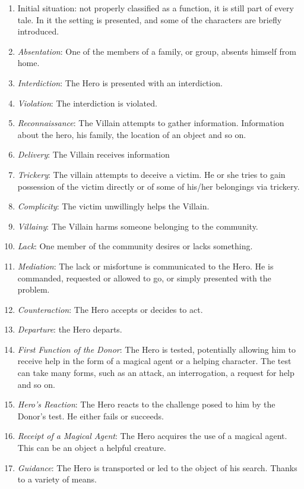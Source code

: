 \documentclass[12pt,a4paper,oneside]{report}
\begin{document}
\begin{enumerate}\setlength{\itemsep}{0pt}
\setcounter{enumi}{-1}
\item Initial situation: not properly classified as a function, it is still part of every tale. In it the setting is presented, and some of the characters are briefly introduced.
\item \textit{Absentation}: One of the members of a family, or group, absents himself from home.
\item \textit{Interdiction}: The Hero is presented with an interdiction.
\item \textit{Violation}: The interdiction is violated.
\item \textit{Reconnaissance}: The Villain attempts to gather information. Information about the hero, his family, the location of an object and so on.
\item \textit{Delivery}: The Villain receives information
\item \textit{Trickery}: The villain attempts to deceive a victim. He or she tries to gain possession of the victim directly or of some of his/her belongings via trickery.
\item \textit{Complicity}: The victim unwillingly helps the Villain.
\item \textit{Villainy}: The Villain harms someone belonging to the community.
\item \textit{Lack}: One member of the community desires or lacks something.
\item \textit{Mediation}: The lack or misfortune is communicated to the Hero. He is commanded, requested or allowed to go, or simply presented with the problem.
\item \textit{Counteraction}: The Hero accepts or decides to act.
\item \textit{Departure}:  the Hero departs.
\item \textit{First Function of the Donor}: The Hero is tested, potentially allowing him to receive help in the form of a magical agent or a helping character. The test can take many forms, such as an attack, an interrogation, a request for help and so on.
\item \textit{Hero's Reaction}: The Hero reacts to the challenge posed to him by the Donor's test. He either fails or succeeds.
\item \textit{Receipt of a Magical Agent}: The Hero acquires the use of a magical agent. This can be an object a helpful creature.
\item \textit{Guidance}: The Hero is transported or led to the object of his search. Thanks to a variety of means.

\end{enumerate}
\end{document}
